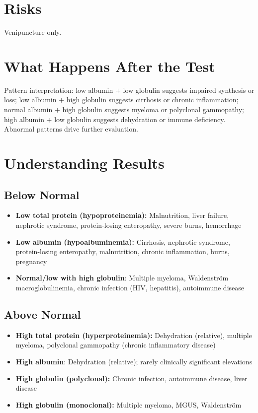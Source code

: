 \section*{Risks}
Venipuncture only.

\section*{What Happens After the Test}
Pattern interpretation: low albumin $+$ low globulin suggests impaired synthesis or loss; low albumin $+$ high globulin suggests cirrhosis or chronic inflammation; normal albumin $+$ high globulin suggests myeloma or polyclonal gammopathy; high albumin $+$ low globulin suggests dehydration or immune deficiency. Abnormal patterns drive further evaluation.

\section*{Understanding Results}

\subsection*{Below Normal}
\begin{itemize}
  \item \textbf{Low total protein (hypoproteinemia):} Malnutrition, liver failure, nephrotic syndrome, protein-losing enteropathy, severe burns, hemorrhage
  \item \textbf{Low albumin (hypoalbuminemia):} Cirrhosis, nephrotic syndrome, protein-losing enteropathy, malnutrition, chronic inflammation, burns, pregnancy
  \item \textbf{Normal/low with high globulin}: Multiple myeloma, Waldenstr\"{o}m macroglobulinemia, chronic infection (HIV, hepatitis), autoimmune disease
\end{itemize}

\subsection*{Above Normal}
\begin{itemize}
  \item \textbf{High total protein (hyperproteinemia):} Dehydration (relative), multiple myeloma, polyclonal gammopathy (chronic inflammatory disease)
  \item \textbf{High albumin}: Dehydration (relative); rarely clinically significant elevations
  \item \textbf{High globulin (polyclonal):} Chronic infection, autoimmune disease, liver disease
  \item \textbf{High globulin (monoclonal):} Multiple myeloma, MGUS, Waldenstr\"{o}m
\end{itemize}

